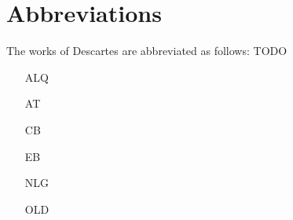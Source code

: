 \chapter{Abbreviations}

The works of Descartes are abbreviated as follows: TODO

\begin{itemize}
    \item[ALQ] 
    \item[AT] 
    \item[CB] 
    \item[EB] 
    \item[NLG] 
    \item[OLD] 
\end{itemize}
